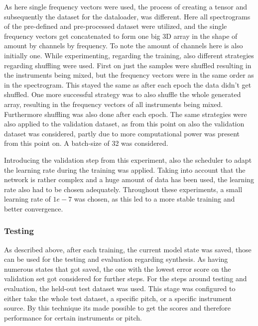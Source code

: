 As here single frequency vectors were used, the process of creating a tensor and subsequently the dataset for the dataloader, was different. Here all spectrograms of the pre-defined and pre-processed dataset were utilized, and the single frequency vectors get concatenated to form one big 3D array in the shape of amount by channels by frequency. To note the amount of channels here is also initially one. While experimenting, regarding the training, also different strategies regarding shuffling were used. First on just the samples were shuffled resulting in the instruments being mixed, but the frequency vectors were in the same order as in the spectrogram. This stayed the same as after each epoch the data didn't get shuffled. One more successful strategy was to also shuffle the whole generated array, resulting in the frequency vectors of all instruments being mixed. Furthermore shuffling was also done after each epoch. The same strategies were also applied to the validation dataset, as from this point on also the validation dataset was considered, partly due to more computational power was present from this point on. A batch-size of 32 was considered. 

Introducing the validation step from this experiment, also the scheduler to adapt the learning rate during the training was applied. Taking into account that the network is rather complex and a huge amount of data has been used, the learning rate also had to be chosen adequately. Throughout these experiments, a small learning rate of $1e-7$ was chosen, as this led to a more stable training and better convergence. 

\subsubsection{Testing}
As described above, after each training, the current model state was saved, those can be used for the testing and evaluation regarding synthesis. As having numerous states that got saved, the one with the lowest error score on the validation set got considered for further steps. For the steps around testing and evaluation, the held-out test dataset was used. This stage was configured to either take the whole test dataset, a specific pitch, or a specific instrument source. By this technique its made possible to get the scores and therefore performance for certain instruments or pitch. 

